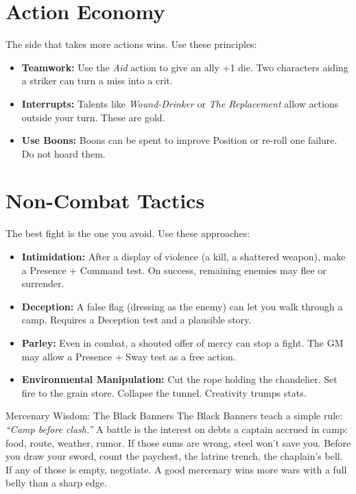 \documentclass[9pt,a5paper]{extbook}
\begin{document}
\section{Action Economy}

The side that takes more actions wins. Use these principles:
\begin{itemize}
    \item \textbf{Teamwork:} Use the \textit{Aid} action to give an ally +1 die. Two characters aiding a striker can turn a miss into a crit.
    \item \textbf{Interrupts:} Talents like \textit{Wound-Drinker} or \textit{The Replacement} allow actions outside your turn. These are gold.
    \item \textbf{Use Boons:} Boons can be spent to improve Position or re-roll one failure. Do not hoard them.
\end{itemize}

\section{Non-Combat Tactics}

The best fight is the one you avoid. Use these approaches:
\begin{itemize}
    \item \textbf{Intimidation:} After a display of violence (a kill, a shattered weapon), make a Presence + Command test. On success, remaining enemies may flee or surrender.
    \item \textbf{Deception:} A false flag (dressing as the enemy) can let you walk through a camp. Requires a Deception test and a plausible story.
    \item \textbf{Parley:} Even in combat, a shouted offer of mercy can stop a fight. The GM may allow a Presence + Sway test as a free action.
    \item \textbf{Environmental Manipulation:} Cut the rope holding the chandelier. Set fire to the grain store. Collapse the tunnel. Creativity trumps stats.
\end{itemize}

\begin{warriorbox}{Mercenary Wisdom: The Black Banners}
The Black Banners teach a simple rule: \textit{``Camp before clash.''} A battle is the interest on debts a captain accrued in camp: food, route, weather, rumor. If those sums are wrong, steel won't save you. Before you draw your sword, count the paychest, the latrine trench, the chaplain's bell. If any of those is empty, negotiate. A good mercenary wins more wars with a full belly than a sharp edge.
\end{warriorbox}
\end{document}
